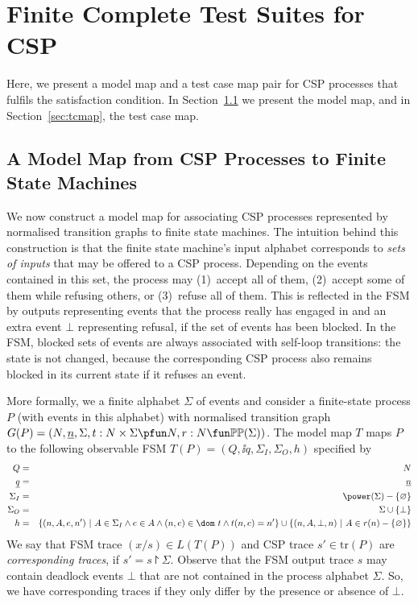 \section{Finite Complete Test Suites for CSP}
\label{sec:finitecomplete}

Here, we present a model map and a test case map pair for CSP processes that
fulfils the satisfaction condition. In Section~\ref{sec:mmap} we present the
model map, and in Section~\ref{sec:tcmap}, the test case map.

\subsection{A Model Map from CSP Processes to Finite State Machines}
\label{sec:mmap}

We now construct a model map for associating CSP processes represented by
normalised transition graphs to finite state machines. The intuition behind
this construction is that the finite state machine's input alphabet
corresponds to {\it sets of inputs} that may be offered to a CSP process.
Depending on the events contained in this set, the process may (1)~accept all
of them, (2)~accept some of them while refusing others, or (3)~refuse all of
them. This is reflected in the FSM by outputs   representing events that the
process really has engaged in and an extra event $\bot$ representing refusal,
if the set of events has been blocked. In the FSM, blocked sets of events are
always associated with self-loop transitions: the state is not changed,
because the corresponding CSP process also remains blocked in its current
state if it refuses an event.

More formally, we a finite alphabet $\Sigma$ of events and consider a
finite-state process $P$ (with events in this alphabet) with normalised
transition graph $G(P)=( N, \ii n, \Sigma, t : N\times\Sigma \pfun N, r : N
\fun \mathbb{P}\mathbb{P}(\Sigma))$. The model map $T$ maps $P$ to the
following observable FSM $T(P) = (Q,\ii q, \Sigma_I,\Sigma_O,h)$ specified by
%
\begin{eqnarray*}
  Q & = & N
  \\
  \ii q & = & \ii n
  \\
  \Sigma_I & = & \power(\Sigma) - \{ \varnothing \}
  \\
  \Sigma_O & = & \Sigma \cup \{ \bot\}
  \\
  h & = & \{ (n,A,e,n')~|~A\in \Sigma_I \wedge e\in A \wedge (n,e)\in \dom~t\wedge t(n,e) = n' \} \cup
  \{ (n,A,\bot,n)~|~A\in r(n) -\{\varnothing\} \}
\end{eqnarray*}
%
We say that FSM trace $(x/s) \in L(T(P))$ and CSP trace $s'\in\text{tr}(P)$
are \emph{corresponding traces}, if $s' = s\project \Sigma$. Observe that the
FSM output trace $s$ may contain deadlock events $\bot$ that are not
contained in the  process alphabet $\Sigma$. So, we have corresponding traces
if they only differ by the presence or absence of $\bot$. 

